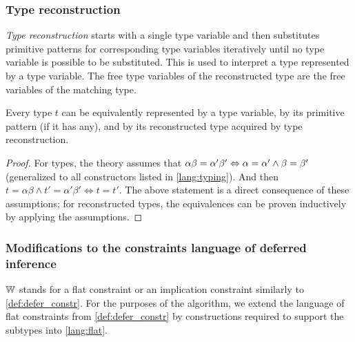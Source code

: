 \subsubsection{Type reconstruction}

\emph{Type reconstruction} starts with a single type variable and then substitutes primitive patterns for corresponding type variables iteratively until no type variable is possible to be substituted. This is used to interpret a type represented by a type variable. The free type variables of the reconstructed type are the free variables of the matching type.

\begin{lemma}
    \label{typesObs}
    Every type $t$ can be equivalently represented by a type variable, by its primitive pattern (if it has any), and by its reconstructed type acquired by type reconstruction.

    \begin{proof}
        For types, the theory assumes that  $\alpha \beta = \alpha' \beta' \Leftrightarrow \alpha = \alpha' \land \beta = \beta'$  (generalized to all constructors listed in \cref{lang:typing}). And then $t = \alpha \beta \land t' = \alpha' \beta' \Leftrightarrow t = t'$. The above statement is a direct consequence of these assumptions; for reconstructed types, the equivalences can be proven inductively by applying the assumptions.
    \end{proof}
\end{lemma}


\subsubsection{Modifications to the constraints language of deferred inference}

$\mathbb{W}$ stands for a flat constraint or an implication constraint similarly to \cref{def:defer_constr}. For the purposes of the algorithm, we extend the language of flat constraints from \cref{def:defer_constr} by constructions required to support the subtypes into \cref{lang:flat}.

